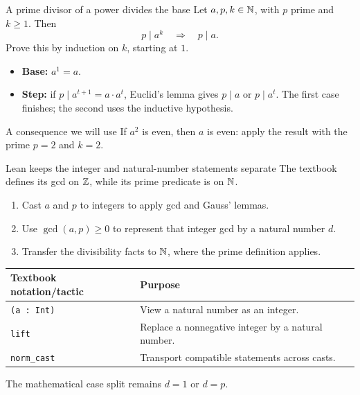 \begin{frame}{A prime divisor of a power divides the base}
Let $a,p,k\in\mathbb{N}$, with $p$ prime and $k\ge1$. Then
\[
p\mid a^k\quad\Longrightarrow\quad p\mid a.
\]
Prove this by induction on $k$, starting at $1$.
\begin{itemize}
\item \textbf{Base:} $a^1=a$.
\item \textbf{Step:} if $p\mid a^{t+1}=a\cdot a^t$, Euclid's lemma gives $p\mid a$ or $p\mid a^t$. The first case finishes; the second uses the inductive hypothesis.
\end{itemize}
\begin{block}{A consequence we will use}
If $a^2$ is even, then $a$ is even: apply the result with the prime $p=2$ and $k=2$.
\end{block}
\end{frame}

\begin{frame}{Lean keeps the integer and natural-number statements separate}
The textbook defines its gcd on $\mathbb{Z}$, while its prime predicate is on $\mathbb{N}$.
\begin{enumerate}
\item Cast $a$ and $p$ to integers to apply gcd and Gauss' lemmas.
\item Use $\gcd(a,p)\ge0$ to represent that integer gcd by a natural number $d$.
\item Transfer the divisibility facts to $\mathbb{N}$, where the prime definition applies.
\end{enumerate}
\begin{center}
\begin{tabular}{ll}
\toprule
Textbook notation/tactic & Purpose\\\midrule
\texttt{(a : Int)} & View a natural number as an integer.\\
\texttt{lift} & Replace a nonnegative integer by a natural number.\\
\texttt{norm\_cast} & Transport compatible statements across casts.\\\bottomrule
\end{tabular}
\end{center}
The mathematical case split remains $d=1$ or $d=p$.
\end{frame}

